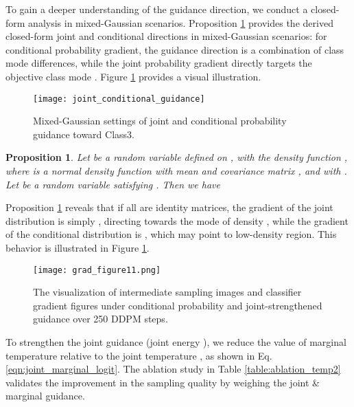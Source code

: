 \documentclass{article}
\newtheorem{proposition}[theorem]{Proposition}
\theoremstyle{definition}
\begin{document}
To gain a deeper understanding of the guidance direction, we conduct a closed-form analysis in mixed-Gaussian scenarios. Proposition \ref{thm_GM} provides the derived closed-form joint and conditional directions in mixed-Gaussian scenarios: for conditional probability gradient, the guidance direction is a combination of class mode differences, while the joint probability gradient directly targets the objective class mode . Figure \ref{fig:joint_conditional_guidance} provides a visual illustration. 


\begin{figure}[h]
  \centering
\texttt{[image: joint\_conditional\_guidance]}
  \caption{Mixed-Gaussian settings of joint and conditional probability guidance toward Class3.}
  \label{fig:joint_conditional_guidance}
\end{figure}

\begin{proposition}\label{thm_GM}
    Let  be a random variable defined on , with the density function , where  is a normal density function with mean  and covariance matrix , and  with . Let  be a random variable satisfying . Then we have
    
\end{proposition}

Proposition \ref{thm_GM} reveals that if all  are identity matrices, the gradient of the joint distribution is simply , directing towards the mode of density , while the gradient of the conditional distribution is , which may point to low-density region. This behavior is illustrated in Figure \ref{fig:joint_conditional_guidance}.

\begin{figure}[h]
  \centering
\texttt{[image: grad\_figure11.png]}
  \caption{The visualization of intermediate sampling images and classifier gradient figures under conditional probability and joint-strengthened guidance over 250 DDPM steps.}
  \label{fig:grad_figure1}
\end{figure} 

To strengthen the joint  guidance (joint energy ), we reduce the value of marginal temperature  relative to the joint temperature , as shown in Eq.\eqref{eqn:joint_marginal_logit}. The ablation study in Table \ref{table:ablation_temp2} validates the improvement in the sampling quality by weighing the joint \& marginal guidance. 
\end{document}
